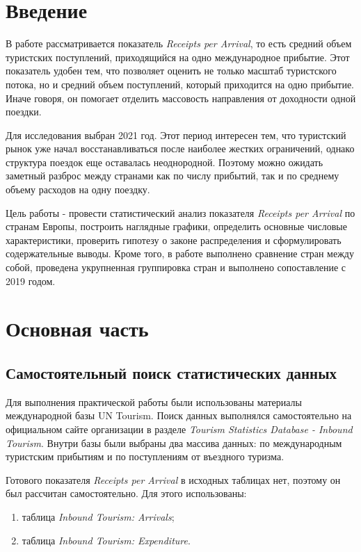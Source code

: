 \documentclass[14pt,a4paper]{extarticle}
\begin{document}
\tableofcontents
\newpage

\section*{Введение}

В работе рассматривается показатель \textit{Receipts per Arrival}, то есть средний объем туристских поступлений, приходящийся на одно международное прибытие. Этот показатель удобен тем, что позволяет оценить не только масштаб туристского потока, но и средний объем поступлений, который приходится на одно прибытие. Иначе говоря, он помогает отделить массовость направления от доходности одной поездки.

Для исследования выбран 2021 год. Этот период интересен тем, что туристский рынок уже начал восстанавливаться после наиболее жестких ограничений, однако структура поездок еще оставалась неоднородной. Поэтому можно ожидать заметный разброс между странами как по числу прибытий, так и по среднему объему расходов на одну поездку.

Цель работы - провести статистический анализ показателя \textit{Receipts per Arrival} по странам Европы, построить наглядные графики, определить основные числовые характеристики, проверить гипотезу о законе распределения и сформулировать содержательные выводы. Кроме того, в работе выполнено сравнение стран между собой, проведена укрупненная группировка стран и выполнено сопоставление с 2019 годом.

\section{Основная часть}

\subsection{Самостоятельный поиск статистических данных}

Для выполнения практической работы были использованы материалы международной базы UN Tourism. Поиск данных выполнялся самостоятельно на официальном сайте организации в разделе \textit{Tourism Statistics Database - Inbound Tourism}. Внутри базы были выбраны два массива данных: по международным туристским прибытиям и по поступлениям от въездного туризма.

Готового показателя \textit{Receipts per Arrival} в исходных таблицах нет, поэтому он был рассчитан самостоятельно. Для этого использованы:
\begin{enumerate}[leftmargin=1.25cm]
    \item таблица \textit{Inbound Tourism: Arrivals};
    \item таблица \textit{Inbound Tourism: Expenditure}.
\end{enumerate}
\end{document}
